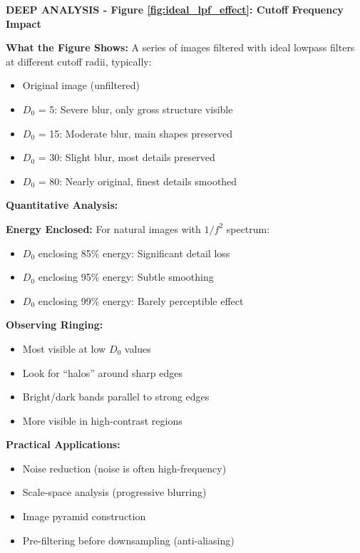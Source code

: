 \documentclass[12pt,a4paper]{article}
\begin{document}
\begin{deepexplanation}
\textbf{DEEP ANALYSIS - Figure \ref{fig:ideal_lpf_effect}: Cutoff Frequency Impact}

\textbf{What the Figure Shows:}
A series of images filtered with ideal lowpass filters at different cutoff radii, typically:
\begin{itemize}
    \item Original image (unfiltered)
    \item $D_0$ = 5: Severe blur, only gross structure visible
    \item $D_0$ = 15: Moderate blur, main shapes preserved
    \item $D_0$ = 30: Slight blur, most details preserved
    \item $D_0$ = 80: Nearly original, finest details smoothed
\end{itemize}

\textbf{Quantitative Analysis:}

\textbf{Energy Enclosed:} For natural images with $1/f^2$ spectrum:
\begin{itemize}
    \item $D_0$ enclosing 85\% energy: Significant detail loss
    \item $D_0$ enclosing 95\% energy: Subtle smoothing
    \item $D_0$ enclosing 99\% energy: Barely perceptible effect
\end{itemize}

\textbf{Observing Ringing:}
\begin{itemize}
    \item Most visible at low $D_0$ values
    \item Look for ``halos'' around sharp edges
    \item Bright/dark bands parallel to strong edges
    \item More visible in high-contrast regions
\end{itemize}

\textbf{Practical Applications:}
\begin{itemize}
    \item Noise reduction (noise is often high-frequency)
    \item Scale-space analysis (progressive blurring)
    \item Image pyramid construction
    \item Pre-filtering before downsampling (anti-aliasing)
\end{itemize}
\end{deepexplanation}
\end{document}
